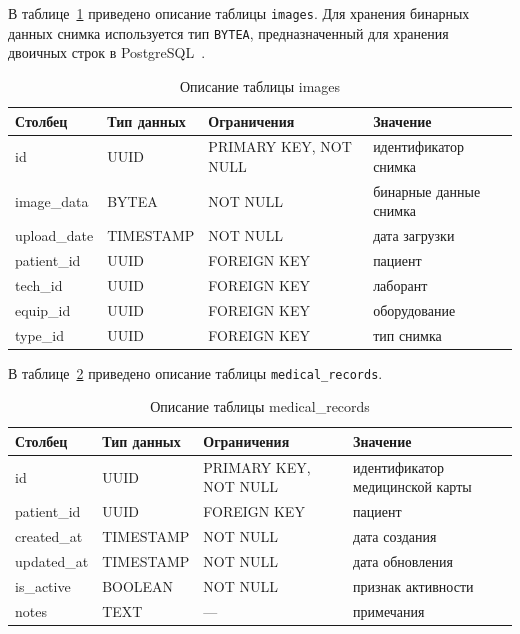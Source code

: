 В таблице~\ref{tab:images-design} приведено описание таблицы \texttt{images}. Для хранения бинарных данных снимка используется тип \texttt{BYTEA}, предназначенный для хранения двоичных строк в PostgreSQL~\cite{postgresql-bytea}.

\begin{table}[H]
	\caption{Описание таблицы images}
	\label{tab:images-design}
	\centering
	\small
	\begin{tabular}{|p{}|p{}|p{}|p{}|}
		\hline
		Столбец & Тип данных & Ограничения & Значение \\
		\hline
		id & UUID & PRIMARY KEY, NOT NULL & идентификатор снимка \\
		\hline
		image\_data & BYTEA & NOT NULL & бинарные данные снимка \\
		\hline
		upload\_date & TIMESTAMP & NOT NULL & дата загрузки \\
		\hline
		patient\_id & UUID & FOREIGN KEY & пациент \\
		\hline
		tech\_id & UUID & FOREIGN KEY & лаборант \\
		\hline
		equip\_id & UUID & FOREIGN KEY & оборудование \\
		\hline
		type\_id & UUID & FOREIGN KEY & тип снимка \\
		\hline
	\end{tabular}
\end{table}

В таблице~\ref{tab:medical-records-design} приведено описание таблицы \texttt{medical\_records}.

\begin{table}[H]
	\caption{Описание таблицы medical\_records}
	\label{tab:medical-records-design}
	\centering
	\small
	\begin{tabular}{|p{}|p{}|p{}|p{}|}
		\hline
		Столбец & Тип данных & Ограничения & Значение \\
		\hline
		id & UUID & PRIMARY KEY, NOT NULL & идентификатор медицинской карты \\
		\hline
		patient\_id & UUID & FOREIGN KEY & пациент \\
		\hline
		created\_at & TIMESTAMP & NOT NULL & дата создания \\
		\hline
		updated\_at & TIMESTAMP & NOT NULL & дата обновления \\
		\hline
		is\_active & BOOLEAN & NOT NULL & признак активности \\
		\hline
		notes & TEXT & --- & примечания \\
		\hline
	\end{tabular}
\end{table}

